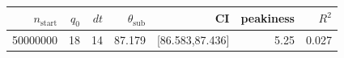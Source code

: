\begin{tabular}{r r r r r r r}
\hline
$n_{\mathrm{start}}$ & $q_0$ & $dt$ & $\theta_{\mathrm{sub}}$ & CI & peakiness & $R^2$ \\
\hline
50000000 & 18 & 14 & 87.179 & [86.583,87.436] & 5.25 & 0.027 \\
\hline
\end{tabular}
